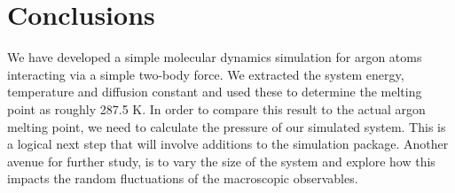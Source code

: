 \documentclass[10pt,showpacs,preprintnumbers,footinbib,amsmath,amssymb,aps,prl,twocolumn,groupedaddress,superscriptaddress,showkeys]{revtex4-1}
\begin{document}





\section{Conclusions}

We have developed a simple molecular dynamics simulation for argon atoms
interacting via a simple two-body force. We extracted the system energy,
temperature and diffusion constant and used these to determine the melting
point as roughly 287.5 K. In order to compare this result to the actual argon
melting point, we need to calculate the pressure of our simulated system.
This is a logical next step that will involve additions to the simulation package.
Another avenue for further study, is to vary the size of the system and
explore how this impacts the random fluctuations of the macroscopic observables.





\end{document}

